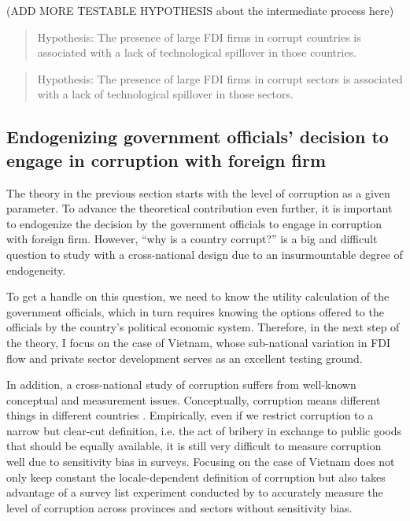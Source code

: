 (ADD MORE TESTABLE HYPOTHESIS about the intermediate process here)

\begin{quote}
Hypothesis: The presence of large FDI firms in corrupt countries is associated with a lack of technological spillover in those countries.
\end{quote}

\begin{quote}
Hypothesis: The presence of large FDI firms in corrupt sectors is associated with a lack of technological spillover in those sectors.
\end{quote}

\subsection{Endogenizing government officials' decision to engage in corruption with foreign firm}

The theory in the previous section starts with the level of corruption as a given parameter. To advance the theoretical contribution even further, it is important to endogenize the decision by the government officials to engage in corruption with foreign firm. However, ``why is a country corrupt?'' is a big and difficult question to study with a cross-national design due to an insurmountable degree of endogeneity. 

To get a handle on this question, we need to know the utility calculation of the government officials, which in turn requires knowing the options offered to the officials by the country's political economic system. Therefore, in the next step of the theory, I focus on the case of Vietnam, whose sub-national variation in FDI flow and private sector development serves as an excellent testing ground.

In addition, a cross-national study of corruption suffers from well-known conceptual and measurement issues. Conceptually, corruption means different things in different countries \citep{Rosen2010}. Empirically, even if we restrict corruption to a narrow but clear-cut definition, i.e. the act of bribery in exchange to public goods that should be equally available, it is still very difficult to measure corruption well due to sensitivity bias in surveys. Focusing on the case of Vietnam does not only keep constant the locale-dependent definition of corruption but also takes advantage of a survey list experiment conducted by \citet{Malesky2015} to accurately measure the level of corruption across provinces and sectors without sensitivity bias.

